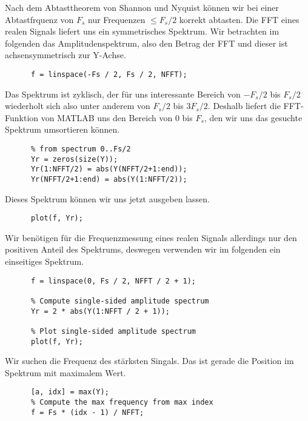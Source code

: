 \documentclass{exercise}
\begin{document}
    Nach dem Abtasttheorem von Shannon und Nyquist können wir bei einer Abtastfrquenz von $F_s$ nur Frequenzen $\le F_s/2$ korrekt abtasten. Die FFT eines realen Signals liefert uns ein symmetrisches Spektrum. Wir betrachten im folgenden das Amplitudenspektrum, also den Betrag der FFT und dieser ist achsensymmetrisch zur Y-Achse.
    \begin{lstlisting}[gobble=6]
      % Compute frequency range
      f = linspace(-Fs / 2, Fs / 2, NFFT);
    \end{lstlisting}

    Das Spektrum ist zyklisch, der für uns interessante Bereich von $-F_s/2$ bis $F_s/2$ wiederholt sich also unter anderem von $F_s/2$ bis $3F_s/2$. Deshalb liefert die FFT-Funktion von MATLAB uns den Bereich von $0$ bis $F_s$, den wir uns das gesuchte Spektrum umsortieren können.
    \begin{lstlisting}[gobble=6]
      % Compute amplitude spectrum -Fs/2..Fs/2
      % from spectrum 0..Fs/2
      Yr = zeros(size(Y));
      Yr(1:NFFT/2) = abs(Y(NFFT/2+1:end));
      Yr(NFFT/2+1:end) = abs(Y(1:NFFT/2));
    \end{lstlisting}

    Dieses Spektrum können wir uns jetzt ausgeben lassen.
    \begin{lstlisting}[gobble=6]
      % Plot amplitude spectrum
      plot(f, Yr);
    \end{lstlisting}
    
    Wir benötigen für die Frequenzmessung eines realen Signals allerdings nur den positiven Anteil des Spektrums, deswegen verwenden wir im folgenden ein einseitiges Spektrum.
    \begin{lstlisting}[gobble=6]
      % Compute single-sided frequency range
      f = linspace(0, Fs / 2, NFFT / 2 + 1);
    
      % Compute single-sided amplitude spectrum
      Yr = 2 * abs(Y(1:NFFT / 2 + 1));
    
      % Plot single-sided amplitude spectrum
      plot(f, Yr);
    \end{lstlisting}

    Wir suchen die Frequenz des stärksten Singals. Das ist gerade die Position im Spektrum mit maximalem Wert.
    \begin{lstlisting}[gobble=6]
      % Get the maximum in the spectrum
      [a, idx] = max(Y);
      % Compute the max frequency from max index
      f = Fs * (idx - 1) / NFFT;
    \end{lstlisting}
\end{document}
